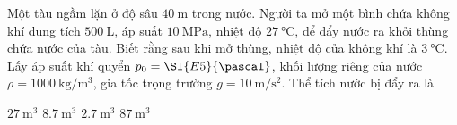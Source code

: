 \begin{ex}
	Một tàu ngầm lặn ở độ sâu $\SI{40}{\meter}$ trong nước. Người ta mở một bình chứa không khí dung tích $\SI{500}{\liter}$, áp suất $\SI{10}{\mega\pascal}$, nhiệt độ $\SI{27}{\celsius}$, để đẩy nước ra khỏi thùng chứa nước của tàu. Biết rằng sau khi mở thùng, nhiệt độ của không khí là $\SI{3}{\celsius}$. Lấy áp suất khí quyển $p_0=\SI{E5}{\pascal}$, khối lượng riêng của nước $\rho=\SI{1000}{\kilogram/\meter^3}$, gia tốc trọng trường $g=\SI{10}{\meter/\second^2}$. Thể tích nước bị đẩy ra là
	
	\choice
	{$\SI{27}{\meter^3}$}
	{\True $\SI{8.7}{\meter^3}$}
	{$\SI{2.7}{\meter^3}$}
	{$\SI{87}{\meter^3}$}
\end{ex}
